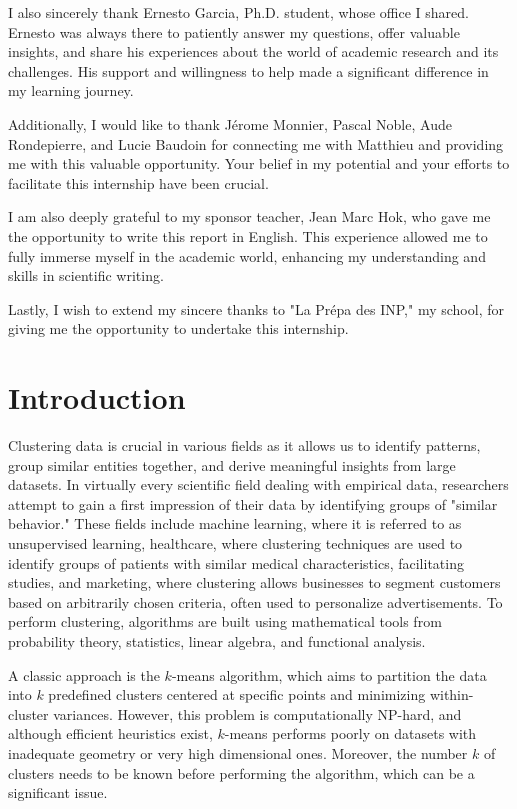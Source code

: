 \documentclass[a4paper,12pt]{article}
\theoremstyle{definition}
\theoremstyle{plain}
\begin{document}
I also sincerely thank Ernesto Garcia, Ph.D. student, whose office I shared. Ernesto was always there to patiently answer my questions, offer valuable insights, and share his experiences about the world of academic research and its challenges. His support and willingness to help made a significant difference in my learning journey.

Additionally, I would like to thank Jérome Monnier, Pascal Noble, Aude Rondepierre, and Lucie Baudoin for connecting me with Matthieu and providing me with this valuable opportunity. Your belief in my potential and your efforts to facilitate this internship have been crucial.

I am also deeply grateful to my sponsor teacher, Jean Marc Hok, who gave me the opportunity to write this report in English. This experience allowed me to fully immerse myself in the academic world, enhancing my understanding and skills in scientific writing.

Lastly, I wish to extend my sincere thanks to "La Prépa des INP," my school, for giving me the opportunity to undertake this internship.

\newpage
\tableofcontents
\newpage
\section{Introduction}
Clustering data is crucial in various fields as it allows us to identify patterns, group similar entities together, and derive meaningful insights from large datasets. In virtually every scientific field dealing with empirical data, researchers attempt to gain a first impression of their data by identifying groups of "similar behavior." These fields include machine learning, where it is referred to as unsupervised learning, healthcare, where clustering techniques are used to identify groups of patients with similar medical characteristics, facilitating studies, and marketing, where clustering allows businesses to segment customers based on arbitrarily chosen criteria, often used to personalize advertisements. To perform clustering, algorithms are built using mathematical tools from probability theory, statistics, linear algebra, and functional analysis. 

A classic approach is the $k$-means algorithm, which aims to partition the data into $k$ predefined clusters centered at specific points and minimizing within-cluster variances. However, this problem is computationally NP-hard, and although efficient heuristics exist, $k$-means performs poorly on datasets with inadequate geometry or very high dimensional ones. Moreover, the number $k$ of clusters needs to be known before performing the algorithm, which can be a significant issue.
\end{document}
